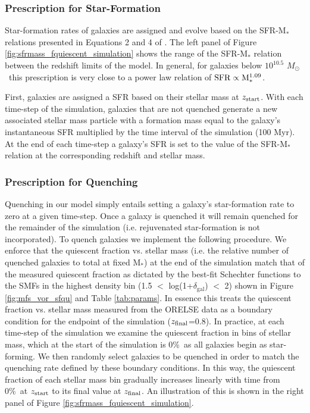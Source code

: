 \documentclass[a4paper,fleqn,usenatbib]{mnras}
\def\msol{$M_{\odot}$}
\begin{document}
\subsubsection{Prescription for Star-Formation}

Star-formation rates of galaxies are assigned and evolve based on the SFR-M$_*$ relations presented in Equations 2 and 4 of \citet{Tomczak2016}.
The left panel of Figure \ref{fig:sfrmass_fquiescent_simulation} shows the range of the SFR-M$_*$ relation between the redshift limits of the model.
In general, for galaxies below $10^{10.5}$ \msol\ this prescription is very close to a power law relation of $\rm{SFR} \propto M_*^{1.09}$.


First, galaxies are assigned a SFR based on their stellar mass at $z_{\rm{start}}$.
With each time-step of the simulation, galaxies that are not quenched generate a new associated stellar mass particle with a formation mass equal to the galaxy's instantaneous SFR multiplied by the time interval of the simulation (100 Myr).
At the end of each time-step a galaxy's SFR is set to the value of the SFR-M$_*$ relation at the corresponding redshift and stellar mass.



\subsubsection{Prescription for Quenching}

Quenching in our model simply entails setting a galaxy's star-formation rate to zero at a given time-step.
Once a galaxy is quenched it will remain quenched for the remainder of the simulation (i.e. rejuvenated star-formation is not incorporated).
To quench galaxies we implement the following procedure.
We enforce that the quiescent fraction vs. stellar mass (i.e. the relative number of quenched galaxies to total at fixed M$_*$) at the end of the simulation match that of the measured quiescent fraction as dictated by the best-fit Schechter functions to the SMFs in the highest density bin (1.5 $<$ log(1+$\delta_{\mathrm{gal}}$) $<$ 2) shown in Figure \ref{fig:mfs_vor_sfqu} and Table \ref{tab:params}.
In essence this treats the quiescent fraction vs. stellar mass measured from the ORELSE data as a boundary condition for the endpoint of the simulation ($z_{\rm{final}}$=0.8).
In practice, at each time-step of the simulation we examine the quiescent fraction in bins of stellar mass, which at the start of the simulation is 0\%\ as all galaxies begin as star-forming.
We then randomly select galaxies to be quenched in order to match the quenching rate defined by these boundary conditions.
In this way, the quiescent fraction of each stellar mass bin gradually increases linearly with time from 0\%\ at $z_{\rm{start}}$ to its final value at $z_{\rm{final}}$.
An illustration of this is shown in the right panel of Figure \ref{fig:sfrmass_fquiescent_simulation}.
\end{document}
